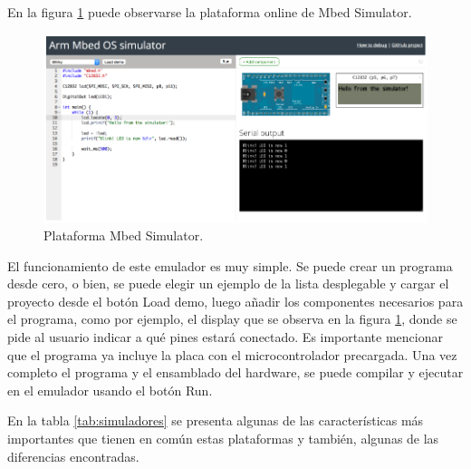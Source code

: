 En la figura \ref{fig:ArmMbed} puede observarse la plataforma online de Mbed Simulator.


\begin{figure}[ht]
	\centering
	\includegraphics[scale=.44]{./Figures/ArmMbed.png}
	\caption{Plataforma Mbed Simulator.}
	\label{fig:ArmMbed}
\end{figure}

El funcionamiento de este emulador es muy simple. Se puede crear un programa desde cero, o bien, se puede elegir un ejemplo de la lista desplegable y cargar el proyecto desde el botón \textquotedbl Load demo\textquotedbl, luego añadir los componentes necesarios para el programa, como por ejemplo, el display que se observa en la figura \ref{fig:ArmMbed}, donde se pide al usuario indicar a qué pines estará conectado. Es importante mencionar que el programa ya incluye la placa con el microcontrolador precargada. Una vez completo el programa y el ensamblado del hardware, se puede compilar y ejecutar en el emulador usando el botón \textquotedbl Run\textquotedbl.

En la tabla \ref{tab:simuladores} se presenta algunas de las características más importantes que tienen en común estas plataformas y también, algunas de las diferencias encontradas.


\hfill \break
\hfill \break
\hfill \break
\hfill \break
\hfill \break
\hfill \break

